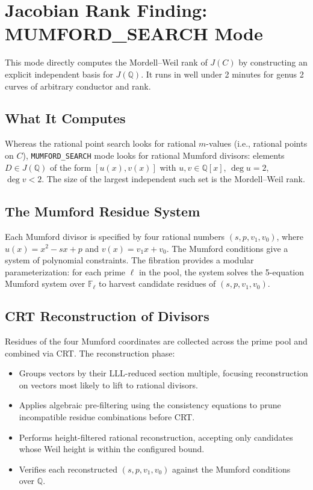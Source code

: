 \documentclass[11pt, a4paper]{article}
\begin{document}
\section{Jacobian Rank Finding: MUMFORD\_SEARCH Mode}

This mode directly computes the Mordell--Weil rank of $J(C)$ by constructing an explicit independent basis for $J(\mathbb{Q})$. It runs in well under 2 minutes for genus 2 curves of arbitrary conductor and rank.

\subsection{What It Computes}

Whereas the rational point search looks for rational $m$-values (i.e., rational points on $C$), \texttt{MUMFORD\_SEARCH} mode looks for rational Mumford divisors: elements $D \in J(\mathbb{Q})$ of the form $[u(x), v(x)]$ with $u, v \in \mathbb{Q}[x]$, $\deg u = 2$, $\deg v < 2$. The size of the largest independent such set is the Mordell--Weil rank.

\subsection{The Mumford Residue System}

Each Mumford divisor is specified by four rational numbers $(s, p, v_1, v_0)$, where $u(x) = x^2 - sx + p$ and $v(x) = v_1 x + v_0$. The Mumford conditions give a system of polynomial constraints. The fibration provides a modular parameterization: for each prime $\ell$ in the pool, the system solves the 5-equation Mumford system over $\mathbb{F}_\ell$ to harvest candidate residues of $(s, p, v_1, v_0)$.

\subsection{CRT Reconstruction of Divisors}

Residues of the four Mumford coordinates are collected across the prime pool and combined via CRT. The reconstruction phase:

\begin{itemize}[label={\textbullet}]
    \item Groups vectors by their LLL-reduced section multiple, focusing reconstruction on vectors most likely to lift to rational divisors.
    \item Applies algebraic pre-filtering using the consistency equations to prune incompatible residue combinations before CRT.
    \item Performs height-filtered rational reconstruction, accepting only candidates whose Weil height is within the configured bound.
    \item Verifies each reconstructed $(s, p, v_1, v_0)$ against the Mumford conditions over $\mathbb{Q}$.
\end{itemize}
\end{document}
